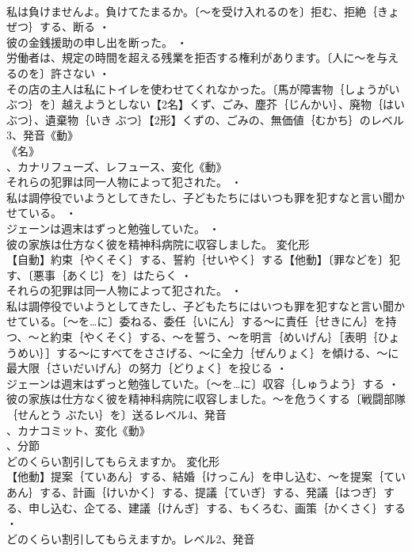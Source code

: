 \documentclass[8pt]{extreport}
\begin{document}
\begin{CJK}{UTF8}{min}
\\	私は負けませんよ。負けてたまるか。〔～を受け入れるのを〕拒む、拒絶｛きょぜつ｝する、断る ・
\\	彼の金銭援助の申し出を断った。 ・
\\	労働者は、規定の時間を超える残業を拒否する権利があります。〔人に～を与えるのを〕許さない ・
\\	その店の主人は私にトイレを使わせてくれなかった。〔馬が障害物｛しょうがいぶつ｝を〕越えようとしない【2名】くず、ごみ、塵芥｛じんかい｝、廃物｛はいぶつ｝、遺棄物｛いき ぶつ｝【2形】くずの、ごみの、無価値｛むかち｝のレベル3、発音《動》
\\	《名》
\\	、カナリフューズ、レフュース、変化《動》
\\	それらの犯罪は同一人物によって犯された。 ・
\\	私は調停役でいようとしてきたし、子どもたちにはいつも罪を犯すなと言い聞かせている。 ・
\\	ジェーンは週末はずっと勉強していた。 ・
\\	彼の家族は仕方なく彼を精神科病院に収容しました。	変化形 
\\	【自動】約束｛やくそく｝する、誓約｛せいやく｝する【他動】〔罪などを〕犯す、〔悪事｛あくじ｝を〕はたらく ・
\\	それらの犯罪は同一人物によって犯された。 ・
\\	私は調停役でいようとしてきたし、子どもたちにはいつも罪を犯すなと言い聞かせている。〔～を…に〕委ねる、委任｛いにん｝する～に責任｛せきにん｝を持つ、～と約束｛やくそく｝する、～を誓う、～を明言｛めいげん｝［表明｛ひょうめい｝］する～にすべてをささげる、～に全力｛ぜんりょく｝を傾ける、～に最大限｛さいだいげん｝の努力｛どりょく｝を投じる ・
\\	ジェーンは週末はずっと勉強していた。〔～を…に〕収容｛しゅうよう｝する ・
\\	彼の家族は仕方なく彼を精神科病院に収容しました。～を危うくする〔戦闘部隊｛せんとう ぶたい｝を〕送るレベル4、発音
\\	、カナコミット、変化《動》
\\	、分節
\\	どのくらい割引してもらえますか。	変化形 
\\	【他動】提案｛ていあん｝する、結婚｛けっこん｝を申し込む、～を提案｛ていあん｝する、計画｛けいかく｝する、提議｛ていぎ｝する、発議｛はつぎ｝する、申し込む、企てる、建議｛けんぎ｝する、もくろむ、画策｛かくさく｝する ・
\\	どのくらい割引してもらえますか。レベル2、発音

\end{CJK}
\end{document}
